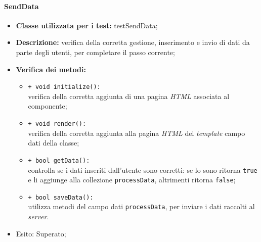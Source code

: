 \paragraph{SendData}
\begin{flushleft}
\begin{itemize}
\item \textbf{Classe utilizzata per i test:} testSendData;
\item \textbf{Descrizione:} verifica della corretta gestione, inserimento e invio di dati da parte degli utenti, per completare il passo corrente;
\item \textbf{Verifica dei metodi:}
\begin{sloppypar}
\begin{itemize}
\item \texttt{+ void initialize():}\\ verifica della corretta aggiunta di una pagina \textit{HTML} associata al componente;
\item \texttt{+ void render():}\\ verifica della corretta aggiunta alla pagina \textit{HTML} del \textit{template} campo dati della classe;
\item \texttt{+ bool getData():}\\ controlla se i dati inseriti dall'utente sono corretti: se lo sono ritorna \texttt{true} e li aggiunge alla collezione \texttt{processData}, altrimenti ritorna \texttt{false};
\item \texttt{+ bool saveData():}\\ utilizza metodi del campo dati \texttt{processData}, per inviare i dati raccolti al \textit{server}.
\end{itemize}
\end{sloppypar}
\item Esito: Superato;
\end{itemize}
\end{flushleft}

